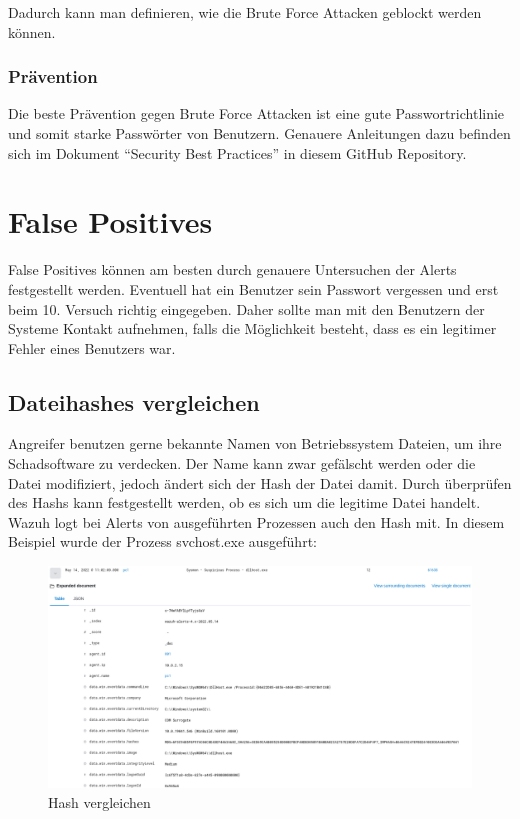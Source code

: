 Dadurch kann man definieren, wie die Brute Force Attacken geblockt werden können.

\subsubsection{Prävention}
Die beste Prävention gegen Brute Force Attacken ist eine gute Passwortrichtlinie und somit starke Passwörter von Benutzern.
Genauere Anleitungen dazu befinden sich im Dokument ``Security Best Practices'' in diesem GitHub Repository.

\section{False Positives}
False Positives können am besten durch genauere Untersuchen der Alerts festgestellt werden.
Eventuell hat ein Benutzer sein Passwort vergessen und erst beim 10. Versuch richtig eingegeben. 
Daher sollte man mit den Benutzern der Systeme Kontakt aufnehmen, falls die Möglichkeit besteht, dass es ein legitimer Fehler eines Benutzers war.  

\subsection{Dateihashes vergleichen}
Angreifer benutzen gerne bekannte Namen von Betriebssystem Dateien, um ihre Schadsoftware zu verdecken.
Der Name kann zwar gefälscht werden oder die Datei modifiziert, jedoch ändert sich der Hash der Datei damit.
Durch überprüfen des Hashs kann festgestellt werden, ob es sich um die legitime Datei handelt. \\

Wazuh logt bei Alerts von ausgeführten Prozessen auch den Hash mit.
In diesem Beispiel wurde der Prozess svchost.exe ausgeführt:
\begin{figure}[H]
    \centering
    \includegraphics[width=\linewidth]{../img/check-hash-1.png}
    \caption{Hash vergleichen}
\end{figure}

